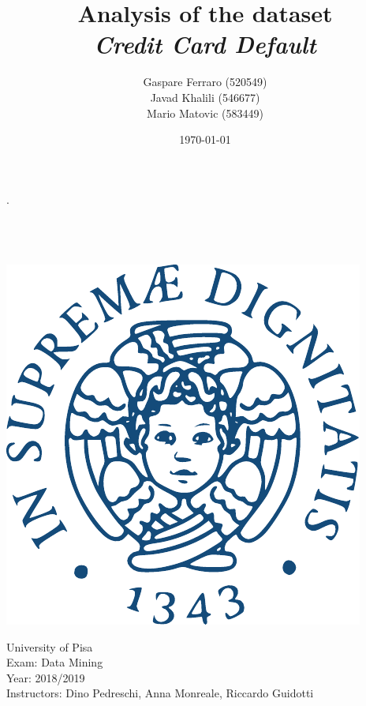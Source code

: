 \documentclass[11pt,a4paper]{report}
\begin{document}
\title{\textbf{Analysis of the dataset\\\textit{Credit Card Default}}}
\author{Gaspare Ferraro (520549)\\Javad	Khalili (546677)\\Mario	Matovic (583449)}
\date{\today}

\makeatletter
    \begin{titlepage}
        \begin{center}
            { . }\\[20ex]
            {\huge \bfseries  \@title }\\[10ex] 
            {\LARGE  \@author}\\[10ex] 
            {\large \@date}\\[45ex]
            
            \noindent
            \begin{minipage}[c]{0.25\linewidth}
              \includegraphics[width=0.9\linewidth]{img/cherubino}\\[4ex]
            \end{minipage} %
            \begin{minipage}[c]{0.7\linewidth}
              University of Pisa\\
              Exam: Data Mining\\
              Year: 2018/2019\\
              Instructors: Dino Pedreschi, Anna Monreale, Riccardo Guidotti
            \end{minipage}

        \end{center}
    \end{titlepage}
\makeatother
\thispagestyle{empty}
\newpage
\end{document}
